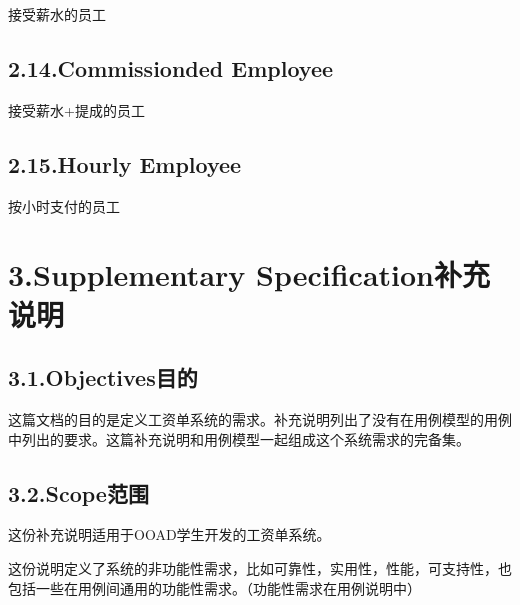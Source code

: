 \documentclass{article}
\begin{document}
\noindent{}接受薪水的员工%

\subsection{2.14.\hspace*{0.5em}Commissionded Employee}\label{sec-commissionded-employee}%

\noindent{}接受薪水+提成的员工%

\subsection{2.15.\hspace*{0.5em}Hourly Employee}\label{sec-hourly-employee}%

\noindent{}按小时支付的员工%

\section{3.\hspace*{0.5em}Supplementary Specification补充说明}\label{sec-supplementary-specification}%

\subsection{3.1.\hspace*{0.5em}Objectives目的}\label{sec-objectives}%

\noindent{}这篇文档的目的是定义工资单系统的需求。补充说明列出了没有在用例模型的用例中列出的要求。这篇补充说明和用例模型一起组成这个系统需求的完备集。%

\subsection{3.2.\hspace*{0.5em}Scope范围}\label{sec-scope}%

\noindent{}这份补充说明适用于OOAD学生开发的工资单系统。%

这份说明定义了系统的非功能性需求，比如可靠性，实用性，性能，可支持性，也包括一些在用例间通用的功能性需求。（功能性需求在用例说明中）%
\end{document}
